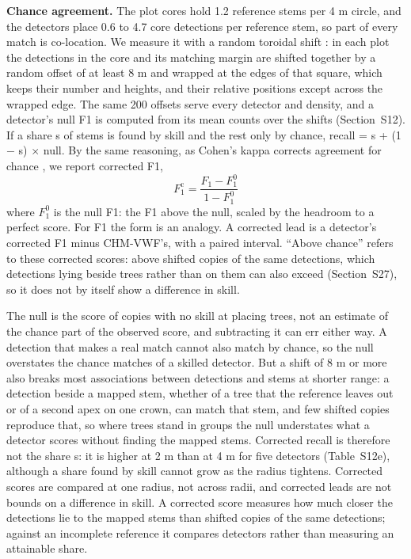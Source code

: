 \documentclass[preprint,12pt,authoryear,a4paper]{elsarticle}
\begin{document}
\textbf{Chance agreement.} The plot cores hold 1.2 reference stems per 4 m circle,
and the detectors place 0.6 to 4.7 core detections per reference stem, so part
of every match is co-location. We measure it with a random toroidal shift
\citep{lotwick1982methods,wiegand2004rings}: in each plot the detections in the
core and its matching margin are shifted together by a random offset of at
least 8 m and wrapped at the edges of that square, which keeps their number
and heights, and their relative positions except across the wrapped edge. The
same 200 offsets serve every detector and density, and a detector's null F1 is
computed from its mean counts over the shifts (Section~S12). If a share s of
stems is found by skill and the rest only by chance, recall = s + (1 $-$ s) $\times$
null. By the same reasoning, as Cohen's kappa corrects agreement for chance
\citep{cohen1960coefficient}, we report corrected F1,
\begin{equation}
F_1^{\mathrm{c}} = \frac{F_1 - F_1^{0}}{1 - F_1^{0}}
\end{equation}
where \(F_1^{0}\) is the null F1: the F1 above the null, scaled by the headroom to
a perfect score. For F1 the form is an analogy. A corrected lead is a detector's
corrected F1 minus CHM-VWF's, with a paired interval. ``Above chance'' refers to
these corrected scores: above shifted copies of the same detections, which
detections lying beside trees rather than on them can also exceed (Section~S27), so it does not by itself show a difference in skill.

The null is the score of copies with no skill at placing trees, not an estimate
of the chance part of the observed score, and subtracting it can err either way.
A detection that makes a real match cannot also match by chance, so the null
overstates the chance matches of a skilled detector. But a shift of 8 m or more
also breaks most associations between detections and stems at shorter range: a
detection beside a mapped stem, whether of a tree that the reference leaves out
or of a second apex on one crown, can match that stem, and few shifted copies
reproduce that, so where trees stand in groups the null understates what a
detector scores without finding the mapped stems. Corrected recall is therefore
not the share s: it is higher at 2 m than at 4 m for five detectors (Table~S12e), although a share found by skill cannot grow as the radius tightens.
Corrected scores are compared at one radius, not across radii, and corrected
leads are not bounds on a difference in skill. A corrected score measures how
much closer the detections lie to the mapped stems than shifted copies of the
same detections; against an incomplete reference it compares detectors rather
than measuring an attainable share.
\end{document}
